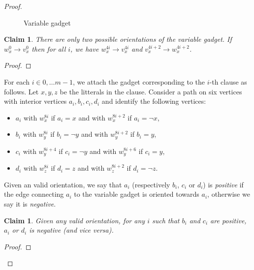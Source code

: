 \documentclass[11pt,a4aper]{article}
\newtheorem{claim}[lemma]{Claim}
\theoremstyle{definition}
\begin{document}
\begin{proof}
\begin{figure}[h!]
    \caption{Variable gadget}
    \label{fig:variable_gadget}    
  \end{figure}

  \begin{claim}\label{cl:variable_alternating}
    There are only two possible orientations of the variable gadget. If
    $w_x^0 \to v_x^0$ then for all $i$, we have $w_x^{4i} \to v_x^{4i}$ and
    $v_x^{4i+2} \to w_x^{4i+2}$.
  \end{claim}
  \begin{proof}
  \end{proof}
  
  For each $i \in {0, \dots m-1}$, we attach the gadget corresponding to the
  $i$-th clause as follows. Let $x, y, z$ be the litterals in the
  clause. Consider a path on six vertices with interior vertices
  $a_i,b_i,c_i,d_i$ and identify the following vertices:

  \begin{itemize}
  \item $a_i$ with $w_x^{8i}$ if $a_i = x$ and with $w_x^{8i+2}$ if
    $a_i = \neg x$,
  \item $b_i$ with $w_y^{8i}$ if $b_i = \neg y$ and with $w_y^{8i+2}$ if
    $b_i = y$,
  \item $c_i$ with $w_y^{8i+4}$ if $c_i = \neg y$ and with $w_y^{8i+6}$ if
    $c_i = y$,
  \item $d_i$ with $w_z^{8i}$ if $d_i = z$ and with $w_z^{8i+2}$ if
    $d_i = \neg z$.
  \end{itemize}

  Given an valid orientation, we say that $a_i$ (respectively $b_i$, $c_i$ or
  $d_i$) is \emph{positive} if the edge connecting $a_i$ to the variable gadget
  is oriented towards $a_i$, otherwise we say it is \emph{negative}.
  \begin{claim}
    Given any valid orientation, for any $i$ such that $b_i$ and $c_i$ are
    positive, $a_i$ or $d_i$ is negative (and vice versa).
  \end{claim}

  \begin{proof}
  \end{proof}
\end{proof}




\end{document}
